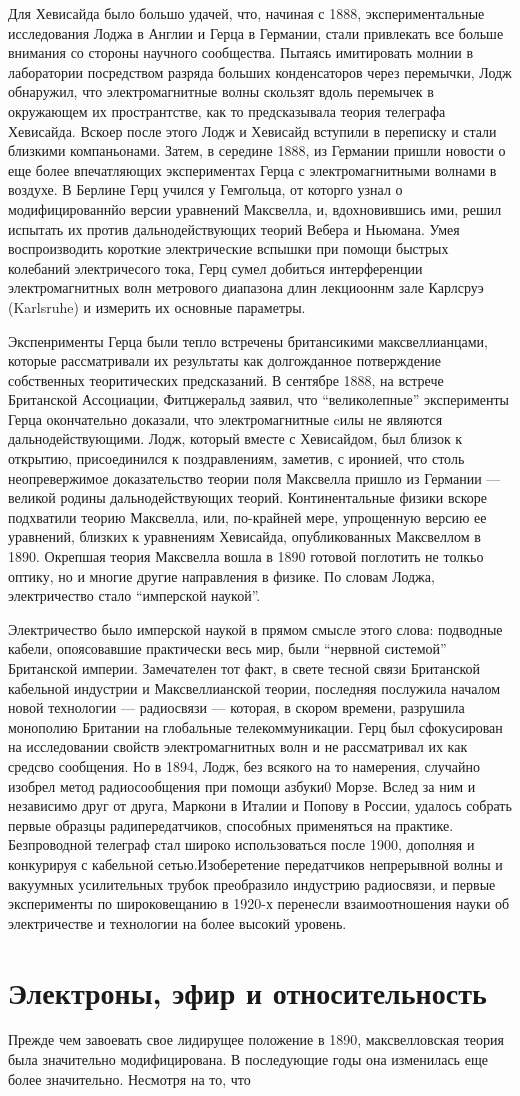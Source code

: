 \documentclass[12pt, oneside, a4paper]{article}
\begin{document}
Для Хевисайда было большо удачей, что, начиная с 1888, экспериментальные исследования Лоджа в Англии и Герца в Германии, стали привлекать все больше внимания со стороны научного сообщества. Пытаясь имитировать молнии  в лаборатории посредством разряда больших конденсаторов через перемычки, Лодж обнаружил, что электромагнитные волны скользят вдоль перемычек в окружающем их пространтстве, как то предсказывала теория телеграфа Хевисайда. Вскоер после этого Лодж и Хевисайд вступили в переписку и стали близкими компаньонами. Затем, в середине 1888, из Германии пришли новости о еще более впечатляющих экспериментах Герца с электромагнитными волнами в воздухе.  В Берлине Герц учился у Гемгольца, от которго узнал о модифицированнйо версии уравнений Максвелла, и, вдохновившись ими, решил испытать их против дальнодействующих теорий Вебера и Ньюмана. Умея воспроизводить короткие электрические вспышки при помощи быстрых колебаний электричесого тока, Герц сумел добиться интерференции электромагнитных волн метрового диапазона длин лекциооннм зале Карлсруэ (Karlsruhe) и измерить их основные параметры.

Экспенрименты Герца были тепло встречены британсикими максвеллианцами, которые рассматривали их результаты как долгожданное потверждение собственных теоритических предсказаний. В сентябре 1888, на встрече Британской Ассоциации, Фитцжеральд заявил, что ``великолепные'' эксперименты Герца окончательно доказали, что электромагнитные cилы не являются дальнодействующими. Лодж, который вместе с Хевисайдом, был близок к открытию, присоединился к поздравлениям, заметив, с иронией, что столь неопревержимое доказательство теории поля Максвелла пришло из Германии --- великой родины дальнодействующих теорий. Континентальные физики вскоре подхватили теорию Максвелла, или, по-крайней мере, упрощенную версию ее уравнений, близких к уравнениям Хевисайда, опубликованных Максвеллом в 1890. Окрепшая теория Максвелла вошла в 1890 готовой поглотить не толкьо оптику, но и многие другие направления в физике. По словам Лоджа, электричество стало ``имперской наукой''.

Электричество было имперской наукой в прямом смысле этого слова: подводные кабели, опоясовавшие практически весь мир, были ``нервной системой'' Британской империи. Замечателен тот факт, в свете тесной связи Британской кабельной индустрии и Максвеллианской теории, последняя послужила началом новой технологии --- радиосвязи --- которая, в скором времени, разрушила монополию Британии на глобальные телекоммуникации. Герц был сфокусирован на исследовании свойств электромагнитных волн и не рассматривал их как средсво сообщения.  Но в 1894, Лодж, без всякого на то намерения, случайно изобрел метод радиосообщения при помощи азбуки0 Морзе. Вслед за ним и независимо друг от друга, Маркони в Италии и Попову в России, удалось собрать первые образцы радипередатчиков, способных применяться на практике. Безпроводной телеграф стал широко использоваться после 1900, дополняя и конкурируя с кабельной сетью.Изоберетение передатчиков непрерывной волны и вакуумных усилительных трубок преобразило индустрию радиосвязи, и первые эксперименты по широковещанию в 1920-х перенесли взаимоотношения науки об электричестве и технологии на более высокий уровень.
\section*{Электроны, эфир и относительность}
Прежде чем завоевать свое лидирущее положение в 1890, максвелловская теория была значительно модифицирована. В последующие годы она изменилась еще более значительно. Несмотря на то, что 
\end{document}
